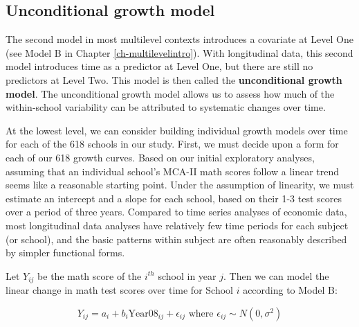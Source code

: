 \documentclass[
]{krantz}
\begin{document}
\hypertarget{modelb9}{%
\subsection{Unconditional growth model}\label{modelb9}}

The second model in most multilevel contexts introduces a covariate at Level One (see Model B in Chapter \ref{ch-multilevelintro}). With longitudinal data, this second model introduces time as a predictor at Level One, but there are still no predictors at Level Two. This model is then called the \textbf{unconditional growth model}.  The unconditional growth model allows us to assess how much of the within-school variability can be attributed to systematic changes over time.

At the lowest level, we can consider building individual growth models over time for each of the 618 schools in our study. First, we must decide upon a form for each of our 618 growth curves. Based on our initial exploratory analyses, assuming that an individual school's MCA-II math scores follow a linear trend seems like a reasonable starting point. Under the assumption of linearity, we must estimate an intercept and a slope for each school, based on their 1-3 test scores over a period of three years. Compared to time series analyses of economic data, most longitudinal data analyses have relatively few time periods for each subject (or school), and the basic patterns within subject are often reasonably described by simpler functional forms.

Let \(Y_{ij}\) be the math score of the \(i^{th}\) school in year \(j\). Then we can model the linear change in math test scores over time for School \(i\) according to Model B:

\begin{equation*}
Y_{ij} = a_{i} + b_{i}\textrm{Year08}_{ij} + \epsilon_{ij} \textrm{ where } \epsilon_{ij} \sim N(0, \sigma^2)
\end{equation*}
\end{document}
